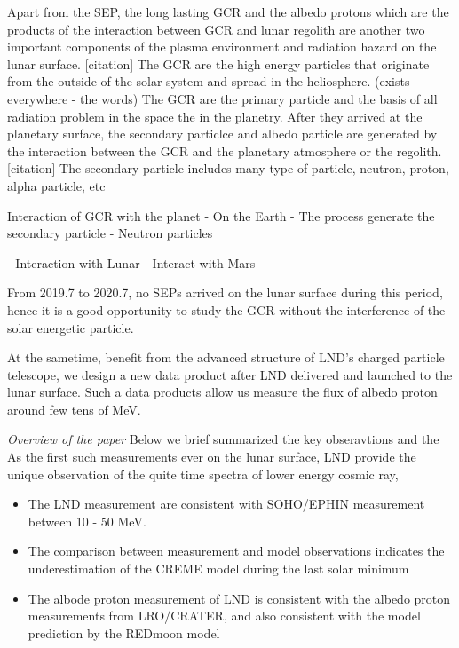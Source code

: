 Apart from the \acs{SEP}, the long lasting \ac{GCR} and the albedo protons which are the products of the interaction between \ac{GCR} and lunar regolith are another two important components of the plasma environment and radiation hazard on the lunar surface. [citation]
The GCR are the high energy particles that originate from the outside of the solar system and spread in the heliosphere. (exists everywhere - the words)
The \ac{GCR} are the primary particle and the basis of all radiation problem in the space the in the planetry.
After they  arrived at the planetary surface, the secondary particlce and albedo particle are generated by the interaction between the \ac{GCR} and the planetary atmosphere or the regolith.  [citation]
The secondary particle includes many type of particle, neutron, proton, alpha particle, etc

Interaction of GCR with the planet
- On the Earth 
    - The process generate the secondary particle
    - Neutron particles	
    
    
- Interaction with Lunar
- Interact with Mars 




From 2019.7 to 2020.7, no SEPs arrived on the lunar surface during this period, hence it is a good opportunity to study the \acs{GCR} without the interference of the solar energetic particle.

At the sametime, benefit from the advanced structure of \ac{LND}'s charged particle telescope, we design a new data product after LND delivered and launched to the lunar surface. Such a data products allow us measure the flux of albedo proton around few tens of MeV.

\textit{Overview of the paper}
Below we brief summarized the key obseravtions and the 
As the first such measurements ever on the lunar surface, LND provide the unique observation of the quite time spectra of lower energy cosmic ray, 

\begin{itemize}
    \item The LND measurement are consistent with SOHO/EPHIN measurement between 10 - 50 MeV. 
    \item The comparison between measurement and model observations indicates the underestimation of the CREME model during the last solar minimum
    \item The albode proton measurement of LND is consistent with the albedo proton measurements from LRO/CRATER, and also consistent with the model prediction by the REDmoon model
\end{itemize}



